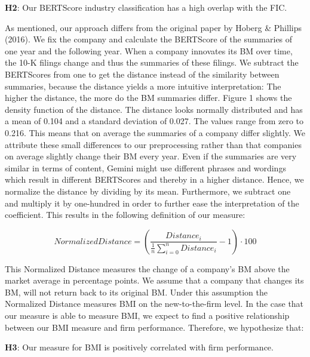 \documentclass[
]{article}
\begin{document}
\textbf{H2}: Our BERTScore industry classification has a high overlap
with the FIC.

As mentioned, our approach differs from the original paper by Hoberg \&
Phillips (2016). We fix the company and calculate the BERTScore of the
summaries of one year and the following year. When a company innovates
its BM over time, the 10-K filings change and thus the summaries of
these filings. We subtract the BERTScores from one to get the distance
instead of the similarity between summaries, because the distance yields
a more intuitive interpretation: The higher the distance, the more do
the BM summaries differ. Figure 1 shows the density function of the
distance. The distance looks normally distributed and has a mean of
0.104 and a standard deviation of 0.027. The values range from zero to
0.216. This means that on average the summaries of a company differ
slightly. We attribute these small differences to our preprocessing
rather than that companies on average slightly change their BM every
year. Even if the summaries are very similar in terms of content, Gemini
might use different phrases and wordings which result in different
BERTScores and thereby in a higher distance. Hence, we normalize the
distance by dividing by its mean. Furthermore, we subtract one and
multiply it by one-hundred in order to further ease the interpretation
of the coefficient. This results in the following definition of our
measure:

\[
{NormalizedDistance} = \left( \frac{{Distance}_i}{\frac{1}{n} \sum_{i=0}^{n} {Distance}_i} - 1 \right) \cdot 100
\]

This Normalized Distance measures the change of a company's BM above the
market average in percentage points. We assume that a company that
changes its BM, will not return back to its original BM. Under this
assumption the Normalized Distance measures BMI on the new-to-the-firm
level. In the case that our measure is able to measure BMI, we expect to
find a positive relationship between our BMI measure and firm
performance. Therefore, we hypothesize that:

\textbf{H3}: Our measure for BMI is positively correlated with firm
performance.
\end{document}
